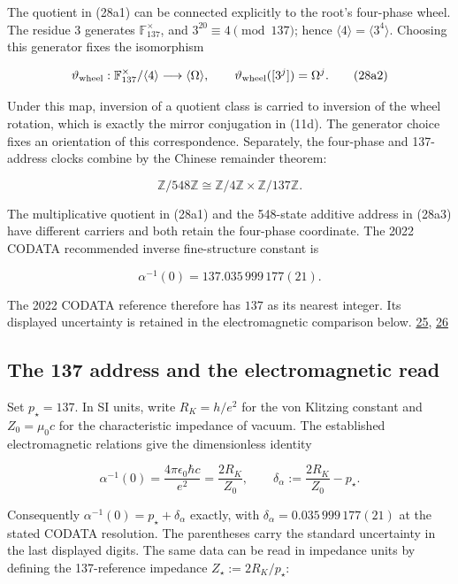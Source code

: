 The quotient in (28a1) can be connected explicitly to the root's four-phase wheel. The residue \(3\) generates \(\mathbb F_{137}^{\times}\), and \(3^{20}\equiv4\pmod{137}\); hence \(\langle4\rangle=\langle3^4\rangle\). Choosing this generator fixes the isomorphism

\[
\vartheta_{\rm wheel}:\mathbb F_{137}^{\times}/\langle4\rangle
\longrightarrow\langle\Omega\rangle,\qquad
\vartheta_{\rm wheel}([3^j])=\Omega^j.
\tag{28a2}
\]

Under this map, inversion of a quotient class is carried to inversion of the wheel rotation, which is exactly the mirror conjugation in (11d). The generator choice fixes an orientation of this correspondence. Separately, the four-phase and 137-address clocks combine by the Chinese remainder theorem:

\[
\mathbb Z/548\mathbb Z\cong
\mathbb Z/4\mathbb Z\times\mathbb Z/137\mathbb Z.
\tag{28a3}
\]

The multiplicative quotient in (28a1) and the 548-state additive address in (28a3) have different carriers and both retain the four-phase coordinate. The 2022 CODATA recommended inverse fine-structure constant is

\[
\alpha^{-1}(0)=137.035\,999\,177(21).
\tag{28b}
\]

The 2022 CODATA reference therefore has \(137\) as its nearest integer. Its displayed uncertainty is retained in the electromagnetic comparison below. \href{https://github.com/Coppalini-Architecture/coppalini-architecture/blob/9b7122ca5c3712c2c294e2bc5097276d0ba9817b/papers/LINEAR_INFINITY_CANONICAL_v0_1.pdf}{25}, \href{https://physics.nist.gov/cuu/pdf/JPCRD2022CODATA.pdf}{26}

\hypertarget{the-137-address-and-the-electromagnetic-read}{%
\subsection{The 137 address and the electromagnetic read}\label{the-137-address-and-the-electromagnetic-read}}

Set \(p_\star=137\). In SI units, write \(R_K=h/e^2\) for the von Klitzing constant and \(Z_0=\mu_0c\) for the characteristic impedance of vacuum. The established electromagnetic relations give the dimensionless identity

\[
\alpha^{-1}(0)
=\frac{4\pi\epsilon_0\hbar c}{e^2}
=\frac{2R_K}{Z_0},
\qquad
\delta_\alpha:=\frac{2R_K}{Z_0}-p_\star .
\tag{28c}
\]

Consequently \(\alpha^{-1}(0)=p_\star+\delta_\alpha\) exactly, with \(\delta_\alpha=0.035\,999\,177(21)\) at the stated CODATA resolution. The parentheses carry the standard uncertainty in the last displayed digits. The same data can be read in impedance units by defining the 137-reference impedance \(Z_\star:=2R_K/p_\star\):

